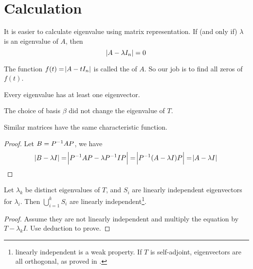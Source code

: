 \section{Calculation}

It is easier to calculate eigenvalue using matrix representation. If (and only if) $\lambda$ is an eigenvalue of $A$, then 
\begin{equation}
    \abs{A - \lambda I_n} = 0
\end{equation}

The function $f(t) = \abs{A - t I_n}$ is called the  of $A$. So our job is to find all zeros of $f(t)$.


\begin{theorem}
    Every eigenvalue has at least one eigenvector.    
\end{theorem}


\begin{theorem}
    The choice of basis $\beta$ did not change the eigenvalue of $T$.
\end{theorem}

\begin{theorem}
Similar matrices have the same characteristic function.    
\end{theorem}

\begin{proof}
    Let $B = {P}^{-1}AP$, we have 
    \begin{equation}
        \abs{B - \lambda I} = \abs{{P}^{-1} A P - \lambda {P}^{-1} I P} = \abs{{P}^{-1} (A - \lambda I) P} = \abs{A - \lambda I}
    \end{equation}
\end{proof}


\begin{theorem}\label{eigenvector_sets_are_linearly_independent}
    Let $\lambda_k$ be distinct eigenvalues of $T$, and $S_i$ are linearly independent eigenvectors for $\lambda_i$. Then $\bigcup_{i=1}^k S_i$ are linearly independent\footnote{linearly independent is a weak property. If $T$ is self-adjoint, eigenvectors are all orthogonal, as proved in .}.
\end{theorem}
\begin{proof}
    Assume they are not linearly independent and multiply the equation by $T - \lambda_k I$. Use deduction to prove.
\end{proof}

